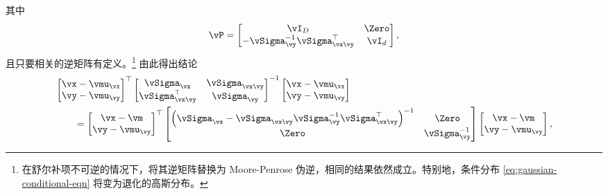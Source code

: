 \documentclass[../../book-main_zh.tex]{subfiles}
\begin{document}
\begin{exercise}
\begin{enumerate}
\begin{equation}
            \end{equation}
            其中
            \begin{equation}
                \vP =
                \begin{bmatrix}
                    \vI_D & \Zero\\
                    -\vSigma_{\vy}^{-1}\vSigma_{\vx\vy}^\top & \vI_d
                \end{bmatrix},
            \end{equation}
            且只要相关的逆矩阵有定义。\footnote{在舒尔补项不可逆的情况下，将其逆矩阵替换为 Moore-Penrose 伪逆，相同的结果依然成立。特别地，条件分布 \eqref{eq:gaussian-conditional-eqn} 将变为退化的高斯分布。}
            由此得出结论
            \begin{align}
                &
                \begin{bmatrix}
                    \vx-\vmu_{\vx} \\
                    \vy-\vmu_{\vy}
                \end{bmatrix}^{\top}
                \begin{bmatrix}
                    \vSigma_{\vx} & \vSigma_{\vx\vy} \\
                    \vSigma_{\vx\vy}^\top & \vSigma_{\vy}
                \end{bmatrix}^{-1}
                \begin{bmatrix}
                    \vx-\vmu_{\vx} \\
                    \vy-\vmu_{\vy}
                \end{bmatrix}
                \\
                &\qquad=
                \begin{bmatrix}
                    \vx - \vm \\
                    \vy - \vmu_{\vy}
                \end{bmatrix}^\top
                \begin{bmatrix}
                    \left(\vSigma_{\vx} - \vSigma_{\vx\vy}
                        \vSigma_{\vy}^{-1}
                    \vSigma_{\vx\vy}^{\top}\right)^{-1} & \Zero \\
                    \Zero & \vSigma_{\vy}^{-1}
                \end{bmatrix}
                \begin{bmatrix}
                    \vx - \vm \\
                    \vy - \vmu_{\vy}
                \end{bmatrix},

\end{align}
\end{enumerate}
\end{exercise}
\end{document}
